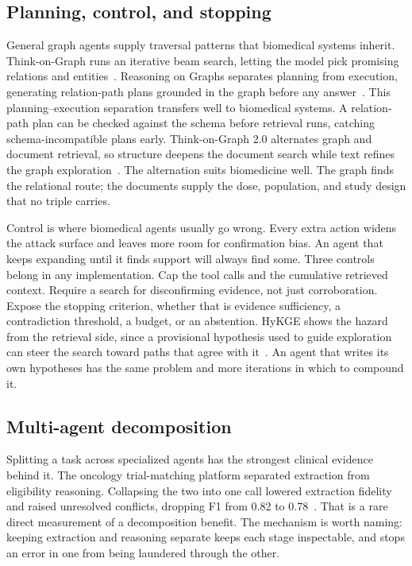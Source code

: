 \subsection{Planning, control, and stopping}

General graph agents supply traversal patterns that biomedical systems inherit. Think-on-Graph runs an iterative beam search, letting the model pick promising relations and entities~\cite{sun2024tog}. Reasoning on Graphs separates planning from execution, generating relation-path plans grounded in the graph before any answer~\cite{luo2024rog}. This planning--execution separation transfers well to biomedical systems. A relation-path plan can be checked against the schema before retrieval runs, catching schema-incompatible plans early. Think-on-Graph 2.0 alternates graph and document retrieval, so structure deepens the document search while text refines the graph exploration~\cite{ma2025tog2}. The alternation suits biomedicine well. The graph finds the relational route; the documents supply the dose, population, and study design that no triple carries.

Control is where biomedical agents usually go wrong. Every extra action widens the attack surface and leaves more room for confirmation bias. An agent that keeps expanding until it finds support will always find some. Three controls belong in any implementation. Cap the tool calls and the cumulative retrieved context. Require a search for disconfirming evidence, not just corroboration. Expose the stopping criterion, whether that is evidence sufficiency, a contradiction threshold, a budget, or an abstention. HyKGE shows the hazard from the retrieval side, since a provisional hypothesis used to guide exploration can steer the search toward paths that agree with it~\cite{jiang2025hykge}. An agent that writes its own hypotheses has the same problem and more iterations in which to compound it.

\subsection{Multi-agent decomposition}

Splitting a task across specialized agents has the strongest clinical evidence behind it. The oncology trial-matching platform separated extraction from eligibility reasoning. Collapsing the two into one call lowered extraction fidelity and raised unresolved conflicts, dropping F1 from 0.82 to 0.78~\cite{loaizabonilla2026trialmatch}. That is a rare direct measurement of a decomposition benefit. The mechanism is worth naming: keeping extraction and reasoning separate keeps each stage inspectable, and stops an error in one from being laundered through the other.

